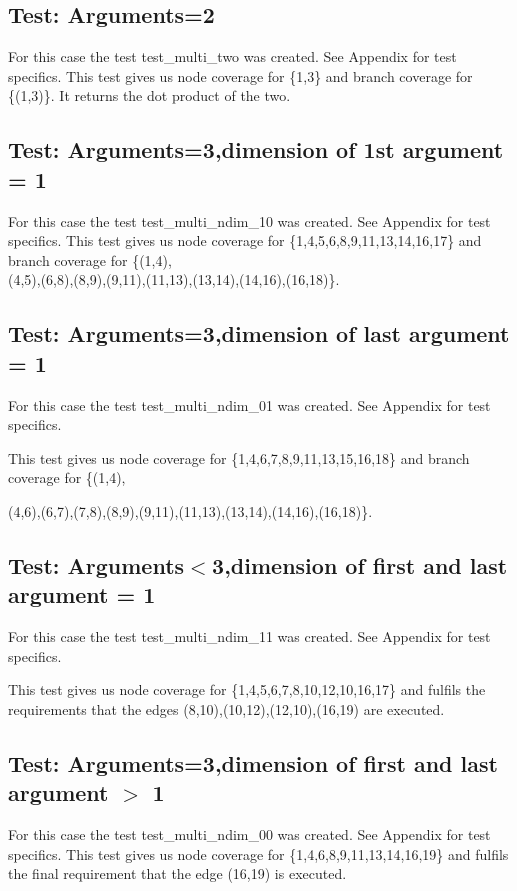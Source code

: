 \subsection{Test: Arguments=2}

For this case the test test\_multi\_two was created. See Appendix for test specifics.
This test gives us node coverage for \{1,3\} and branch coverage for \{(1,3)\}. It returns the dot product of the two.


\subsection{Test: Arguments=3,dimension of 1st argument = 1}

For this case the test test\_multi\_ndim\_10 was created. See Appendix for test specifics.
This test gives us node coverage for \{1,4,5,6,8,9,11,13,14,16,17\} and branch coverage for \{(1,4),
\\
(4,5),(6,8),(8,9),(9,11),(11,13),(13,14),(14,16),(16,18)\}.




\subsection{Test: Arguments=3,dimension of last argument = 1}

For this case the test test\_multi\_ndim\_01 was created. See Appendix for test specifics.

This test gives us node coverage for \{1,4,6,7,8,9,11,13,15,16,18\} and branch coverage for \{(1,4),

(4,6),(6,7),(7,8),(8,9),(9,11),(11,13),(13,14),(14,16),(16,18)\}.



\subsection{Test: Arguments$<$3,dimension of first and last argument = 1}

For this case the test test\_multi\_ndim\_11 was created. See Appendix for test specifics.

This test gives us node coverage for \{1,4,5,6,7,8,10,12,10,16,17\} and fulfils the requirements that the edges {(8,10),(10,12),(12,10),(16,19)} are executed.


\subsection{Test: Arguments=3,dimension of first and last argument $>$ 1}


For this case the test test\_multi\_ndim\_00 was created. See Appendix for test specifics.
This test gives us node coverage for \{1,4,6,8,9,11,13,14,16,19\} and fulfils the final requirement that the edge (16,19) is executed.


